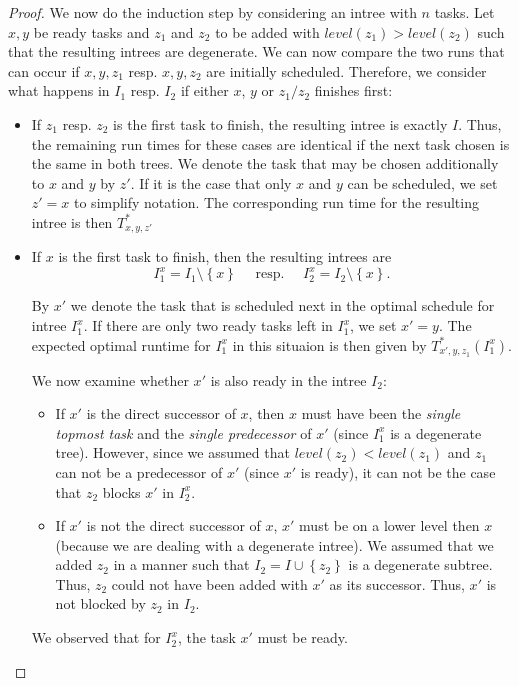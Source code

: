 \begin{proof}
  We now do the induction step by considering an intree with $n$ tasks. 
  Let $x,y$ be ready tasks and $z_1$ and $z_2$ to be added with $level(z_1) > level(z_2)$ such that the resulting intrees are degenerate.
  We can now compare the two runs that can occur if $x,y,z_1$ resp. $x,y,z_2$ are initially scheduled. 
  Therefore, we consider what happens in $I_1$ resp. $I_2$ if either $x$, $y$ or $z_1/z_2$ finishes first:

  \begin{itemize}
  \item If $z_1$ resp. $z_2$ is the first task to finish, the resulting intree is exactly $I$. Thus, the remaining run times for these cases are identical if the next task chosen is the same in both trees. We denote the task that may be chosen additionally to $x$ and $y$ by $z'$. If it is the case that only $x$ and $y$ can be scheduled, we set $z'=x$ to simplify notation. The corresponding run time for the resulting intree is then $T^*_{x,y,z'}$

  \item If $x$ is the first task to finish, then the resulting intrees are 
    \begin{equation*}
      I^x_{1}=I_1\setminus\left\{ x \right\} \quad \text{ resp. } \quad I^x_{2}=I_2\setminus\left\{ x \right\}.
    \end{equation*}

    By $x'$ we denote the task that is scheduled next in the optimal schedule for intree $I_1^x$. 
    If there are only two ready tasks left in $I_1^x$, we set $x'=y$. The expected optimal runtime for $I_1^x$ in this situaion is then given by $T_{x',y,z_1}^*(I_1^x)$.

    We now examine whether $x'$ is also ready in the intree $I_2$:
    \begin{itemize}
    \item If $x'$ is the direct successor of $x$, then $x$ must have been the \emph{single topmost task} and the \emph{single predecessor} of $x'$ (since $I_1^x$ is a degenerate tree). However, since we assumed that $level(z_2)<level(z_1)$ and $z_1$ can not be a predecessor of $x'$ (since $x'$ is ready), it can not be the case that $z_2$ blocks $x'$ in $I_2^x$.

    \item If $x'$ is not the direct successor of $x$, $x'$ must be on a lower level then $x$ (because we are dealing with a degenerate intree). We assumed that we added $z_2$ in a manner such that $I_2=I\cup\left\{ z_2 \right\}$ is a degenerate subtree. Thus, $z_2$ could not have been added with $x'$ as its successor. Thus, $x'$ is not blocked by $z_2$ in $I_2$.
    \end{itemize}
    We observed that for $I_2^x$, the task $x'$ must be ready.
    

\end{itemize}
\end{proof}
